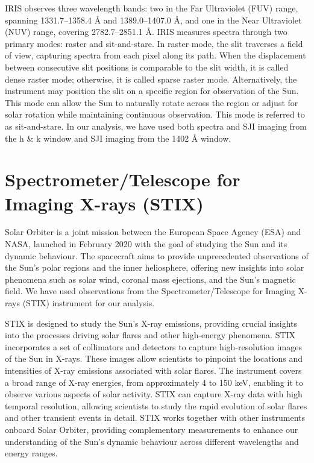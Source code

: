 IRIS observes three wavelength bands: two in the Far Ultraviolet (FUV) range, spanning 1331.7–1358.4 {\AA} and 1389.0–1407.0 {\AA}, and one in the Near Ultraviolet (NUV) range, covering 2782.7–2851.1 {\AA}. IRIS measures spectra through two primary modes: raster and sit-and-stare. In raster mode, the slit traverses a field of view, capturing spectra from each pixel along its path. When the displacement between consecutive slit positions is comparable to the slit width, it is called dense raster mode; otherwise, it is called sparse raster mode. Alternatively, the instrument may position the slit on a specific region for observation of the Sun. This mode can allow the Sun to naturally rotate across the region or adjust for solar rotation while maintaining continuous observation. This mode is referred to as sit-and-stare. In our analysis, we have used both spectra and SJI imaging from the  h \& k window and SJI imaging from the  1402 {\AA} window.

\section{Spectrometer/Telescope for Imaging X-rays (STIX)}

Solar Orbiter \citep[SO;][]{so} is a joint mission between the European Space Agency (ESA) and NASA, launched in February 2020 with the goal of studying the Sun and its dynamic behaviour. The spacecraft aims to provide unprecedented observations of the Sun's polar regions and the inner heliosphere, offering new insights into solar phenomena such as solar wind, coronal mass ejections, and the Sun's magnetic field. We have used observations from the Spectrometer/Telescope for Imaging X-rays (STIX) instrument for our analysis.

 STIX \citep{stix,stix1} is designed to study the Sun's X-ray emissions, providing crucial insights into the processes driving solar flares and other high-energy phenomena. STIX incorporates a set of collimators and detectors to capture high-resolution images of the Sun in X-rays. These images allow scientists to pinpoint the locations and intensities of X-ray emissions associated with solar flares. The instrument covers a broad range of X-ray energies, from approximately 4 to 150 keV, enabling it to observe various aspects of solar activity. STIX can capture X-ray data with high temporal resolution, allowing scientists to study the rapid evolution of solar flares and other transient events in detail. STIX works together with other instruments onboard Solar Orbiter, providing complementary measurements to enhance our understanding of the Sun's dynamic behaviour across different wavelengths and energy ranges.

